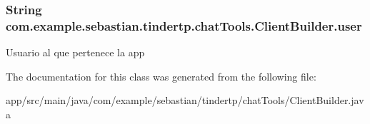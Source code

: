\subsubsection[{\texorpdfstring{user}{user}}]{\setlength{\rightskip}{0pt plus 5cm}String com.\+example.\+sebastian.\+tindertp.\+chat\+Tools.\+Client\+Builder.\+user\hspace{0.3cm}{\ttfamily [private]}}\hypertarget{classcom_1_1example_1_1sebastian_1_1tindertp_1_1chatTools_1_1ClientBuilder_a5689629482292f87ffd3c7786568f7d6}{}\label{classcom_1_1example_1_1sebastian_1_1tindertp_1_1chatTools_1_1ClientBuilder_a5689629482292f87ffd3c7786568f7d6}
Usuario al que pertenece la app 

The documentation for this class was generated from the following file\+:\begin{DoxyCompactItemize}
\item 
app/src/main/java/com/example/sebastian/tindertp/chat\+Tools/Client\+Builder.\+java\end{DoxyCompactItemize}

